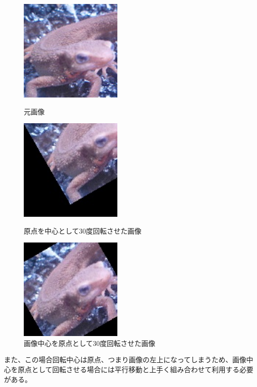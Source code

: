         \begin{figure}[htbp]
            \begin{minipage}{0.5\hsize}
                \begin{center}
                    \includegraphics[width=50mm]{./8_appendix/img/imori.jpg}
                \end{center}
                \caption{元画像}
            \end{minipage}
            \begin{minipage}{0.5\hsize}
                \begin{center}
                    \includegraphics[width=50mm]{./8_appendix/img/imori_Rotate.jpg}
                \end{center}
                \caption{原点を中心として30度回転させた画像}
            \end{minipage}
            \begin{minipage}{0.5\hsize}
                \begin{center}
                    \includegraphics[width=50mm]{./8_appendix/img/imori_Rotate_center.jpg}
                \end{center}
                \caption{画像中心を原点として30度回転させた画像}
            \end{minipage}
        \end{figure}
        また、この場合回転中心は原点、つまり画像の左上になってしまうため、画像中心を原点として回転させる場合には平行移動と上手く組み合わせて利用する必要がある。
    
